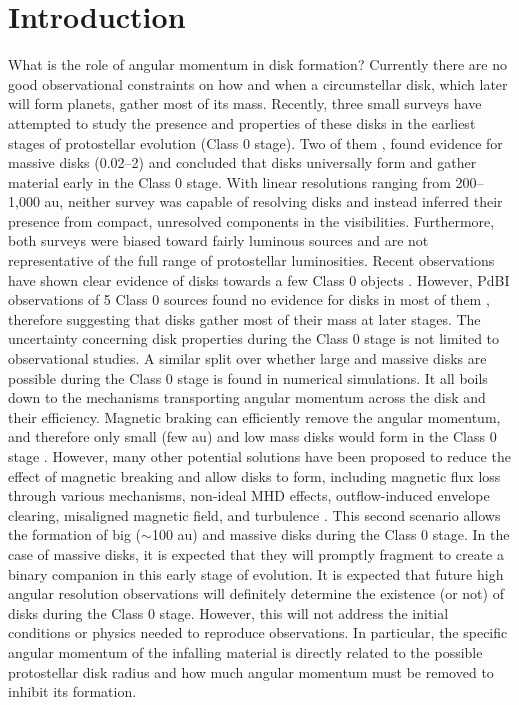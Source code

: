 \section{Introduction}

What is the role of angular momentum in disk formation?
Currently there are no good observational constraints on how and when a circumstellar disk, which later will form planets, gather most of its mass. 
Recently, three small surveys have attempted to study the presence and properties of these disks in the earliest stages of protostellar evolution (Class 0 stage). 
Two of them \citep{J_rgensen_2009,Enoch_2011}, found evidence for massive disks (0.02--2\msun) and concluded that disks universally form and gather material early in the Class 0 stage. With linear resolutions ranging from 200--1,000 au, neither survey was capable of resolving disks and instead inferred their presence from compact, unresolved components in the visibilities. 
Furthermore, both surveys were biased toward fairly luminous sources and are not representative of the full range of protostellar luminosities. 
Recent observations have shown clear evidence of disks towards a few Class 0 objects \citep{Murillo_2013,Ohashi_2014}. 
However, PdBI observations of 5 Class 0 sources found no evidence for disks in most of them \citep{Maury_2010}, 
therefore suggesting that disks gather most of their mass at later stages.
The uncertainty concerning disk properties during the Class 0 stage is not limited to observational studies. 
A similar split over whether large and massive disks are possible during the Class 0 stage is found in numerical simulations. 
It all boils down to the mechanisms transporting angular momentum across the disk and their efficiency. 
Magnetic braking can efficiently remove the angular momentum, and therefore only small (few au) and low mass disks would form in the Class 0 stage \citep{Allen_2003,Hennebelle_2008,Mellon_2008,Seifried_2011}. 
However, many other potential solutions have been proposed to reduce the effect of magnetic breaking and allow disks to form, including magnetic flux loss through various mechanisms, non-ideal MHD effects, outflow-induced envelope clearing, misaligned magnetic field, and turbulence \citep{Mellon_2008,Li_2011,Seifried_2012}. 
This second scenario allows the formation of big ($\sim$100 au) and massive disks during the Class 0 stage. 
In the case of massive disks, it is expected that they will promptly fragment to create a binary companion in this early stage of evolution.
It is expected that future high angular resolution observations will definitely determine the existence (or not) of disks during the Class 0 stage. 
However, this will not address the initial conditions or physics needed to reproduce observations. 
In particular, the specific angular momentum of the infalling material is directly related to the possible protostellar disk radius  and how much angular momentum must be removed to inhibit its formation.

